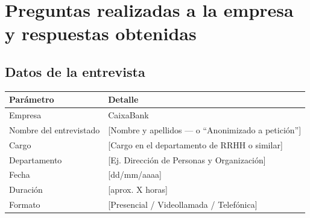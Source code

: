 %

\appendix
\section{Preguntas realizadas a la empresa y respuestas obtenidas}

\subsection{Datos de la entrevista}

\begin{table}[H]
  \centering
  \begin{tabularx}{\textwidth}{lX}
    \toprule
    \textbf{Parámetro}       & \textbf{Detalle} \\
    \midrule
    Empresa                  & CaixaBank \\
    Nombre del entrevistado  & [Nombre y apellidos — o ``Anonimizado a petición''] \\
    Cargo                    & [Cargo en el departamento de RRHH o similar] \\
    Departamento             & [Ej. Dirección de Personas y Organización] \\
    Fecha                    & [dd/mm/aaaa] \\
    Duración                 & [aprox. X horas] \\
    Formato                  & [Presencial / Videollamada / Telefónica] \\
    \bottomrule
  \end{tabularx}
\end{table}

